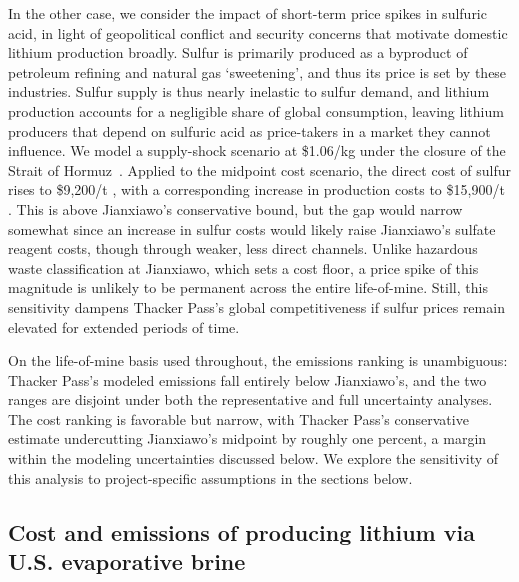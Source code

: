\documentclass{article}
\renewcommand\_{\textunderscore\allowbreak}
\begin{document}
In the other case, we consider the impact of short-term price spikes in sulfuric acid, in light of geopolitical conflict and security concerns that motivate domestic lithium production broadly. Sulfur is primarily produced as a byproduct of petroleum refining and natural gas `sweetening', and thus its price is set by these industries. Sulfur supply is thus nearly inelastic to sulfur demand, and lithium production accounts for a negligible share of global consumption, leaving lithium producers that depend on sulfuric acid as price-takers in a market they cannot influence. We model a supply-shock scenario at \$1.06/kg under the closure of the Strait of Hormuz~\cite{silveiralimaGlobalSulfurPrices2026}. Applied to the midpoint cost scenario, the direct cost of sulfur rises to \$9,200/t , with a corresponding increase in production costs to \$15,900/t . This is above Jianxiawo's conservative bound, but the gap would narrow somewhat since an increase in sulfur costs would likely raise Jianxiawo's sulfate reagent costs, though through weaker, less direct channels. Unlike hazardous waste classification at Jianxiawo, which sets a cost floor, a price spike of this magnitude is unlikely to be permanent across the entire life-of-mine. Still, this sensitivity dampens Thacker Pass's global competitiveness if sulfur prices remain elevated for extended periods of time. 

On the life-of-mine basis used throughout, the emissions ranking is unambiguous: Thacker Pass's modeled emissions fall entirely below Jianxiawo's, and the two ranges are disjoint under both the representative and full uncertainty analyses. The cost ranking is favorable but narrow, with Thacker Pass's conservative estimate undercutting Jianxiawo's midpoint by roughly one percent, a margin within the modeling uncertainties discussed below. We explore the sensitivity of this analysis to project-specific assumptions in the sections below.

\subsection{Cost and emissions of producing lithium via U.S. evaporative brine}\label{sec:04-silverpeak}
\end{document}
